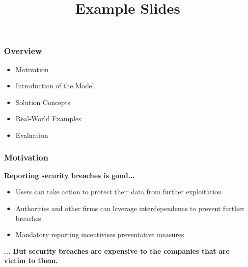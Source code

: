 \documentclass[11pt,t,usepdftitle=false,aspectratio=169]{beamer}
\title{Example Slides}
\begin{document}
	
	\begin{frame}
		\frametitle{Overview}
		\Large{
			\begin{itemize}
				\setlength\itemsep{3mm} 
				\item Motivation
				\item Introduction of the Model 
				\item Solution Concepts 
				\item Real-World Examples 
				\item Evaluation 
		\end{itemize}}
	\end{frame}

\begin{frame}
	\frametitle{Motivation}
	\begin{center}
		\textbf{Reporting security breaches is good...}
	\end{center}
	\begin{itemize}
		\item Users can take action to protect their data from further exploitation
		\item Authorities and other firms can leverage interdependence to prevent further breaches
		\item Mandatory reporting incentivises preventative measures
	\end{itemize}
	\bigskip
	\begin{center}
		\pause \textbf{... But security breaches are expensive to the companies that are victim to them.\\}
	\end{center}
\end{frame}
	
\end{document}

